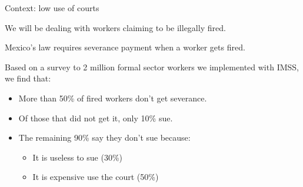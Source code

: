 \documentclass[9pt]{beamer}
\begin{document}
\begin{frame}{Context: low use of courts}

We will be dealing with workers claiming to be illegally fired.

\vspace{.1in}

Mexico's law requires severance payment when a worker gets fired.

\vspace{.2in}
Based on a survey to 2 million formal sector workers we implemented with IMSS, we find that:

\vspace{.1in}
\begin{itemize}
    \item  More than 50\% of fired workers don't get severance.
    \vspace{.1in}
    \item Of those that did not get it, only 10\% sue. 
    \vspace{.1in}
    \item The remaining 90\% say they don't sue because:
    \begin{itemize}
        \item It is useless to sue (30\%)
        \item It is expensive use the court (50\%)
        
    \end{itemize}
    \vspace{.1in}
    \vspace{.1in}

\end{itemize}
\end{frame}


\end{document}
